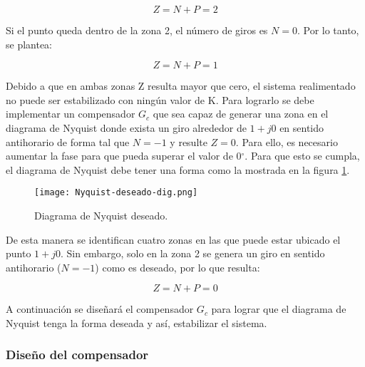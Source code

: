 \begin{equation*}
	Z = N + P = 2
\end{equation*}


Si el punto queda dentro de la zona 2, el número de giros es $N=0$. Por lo tanto, se plantea:

\begin{equation*}
	Z = N + P = 1
\end{equation*}

Debido a que en ambas zonas Z resulta mayor que cero, el sistema realimentado no puede ser estabilizado con ningún valor de K. Para lograrlo se debe implementar un compensador $G_c$ que sea capaz de generar una zona en el diagrama de Nyquist donde exista un giro alrededor de $1 + j0$ en sentido antihorario de forma tal que $N=-1$ y resulte $Z=0$. Para ello, es necesario aumentar la fase para que pueda superar el valor de 0$\mathrm{{}^\circ}$. Para que esto se cumpla, el diagrama de Nyquist debe tener una forma como la  mostrada en la figura \ref{fig:nyquist-deseado-dig}.

\begin{figure}[H]
	\centering
	\texttt{[image: Nyquist-deseado-dig.png]}
	\caption{Diagrama de Nyquist deseado.}
	\label{fig:nyquist-deseado-dig}
\end{figure}

De esta manera se identifican cuatro zonas en las que puede estar ubicado el punto $1+j0$. Sin embargo, solo en la zona 2 se genera un giro en sentido antihorario ($N=-1$) como es deseado, por lo que resulta:

\begin{equation*}
	Z = N + P = 0
\end{equation*}


A continuación se diseñará el compensador $G_c$ para lograr que el diagrama de Nyquist tenga la forma deseada y así, estabilizar el sistema.

\subsubsection{Diseño del compensador}

